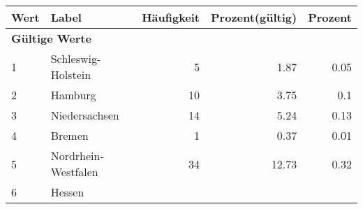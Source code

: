      \begin{longtable}{lXrrr}
     \toprule
     \textbf{Wert} & \textbf{Label} & \textbf{Häufigkeit} & \textbf{Prozent(gültig)} & \textbf{Prozent} \\
     \endhead
     \midrule
     \multicolumn{5}{l}{\textbf{Gültige Werte}}\\

     1 &
     \multicolumn{1}{X}{ Schleswig-Holstein   } &


       \num{5} &
       \num[round-mode=places,round-precision=2]{1,87} &
         \num[round-mode=places,round-precision=2]{0,05} \\

     2 &
     \multicolumn{1}{X}{ Hamburg   } &


       \num{10} &
       \num[round-mode=places,round-precision=2]{3,75} &
         \num[round-mode=places,round-precision=2]{0,1} \\

     3 &
     \multicolumn{1}{X}{ Niedersachsen   } &


       \num{14} &
       \num[round-mode=places,round-precision=2]{5,24} &
         \num[round-mode=places,round-precision=2]{0,13} \\

     4 &
     \multicolumn{1}{X}{ Bremen   } &


       \num{1} &
       \num[round-mode=places,round-precision=2]{0,37} &
         \num[round-mode=places,round-precision=2]{0,01} \\

     5 &
     \multicolumn{1}{X}{ Nordrhein-Westfalen   } &


       \num{34} &
       \num[round-mode=places,round-precision=2]{12,73} &
         \num[round-mode=places,round-precision=2]{0,32} \\

     6 &
     \multicolumn{1}{X}{ Hessen   } &



\end{longtable}

